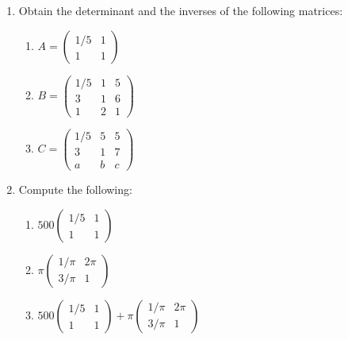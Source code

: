 \begin{enumerate}

\item 

Obtain the determinant and the inverses of the following matrices:
\begin{enumerate}

\item 

\(A = \begin{pmatrix} 1 / 5 & 1\\1 & 1\end{pmatrix}\)

\item 

\(B = \begin{pmatrix} 1 / 5 & 1 & 5\\3 & 1 & 6 \\ 1 & 2 & 1\end{pmatrix}\)

\item 

\(C = \begin{pmatrix} 1 / 5 & 5 & 5\\3 & 1 & 7 \\ a & b & c\end{pmatrix}\)

\end{enumerate}

\item 

Compute the following:
\begin{enumerate}

\item 

\(500\begin{pmatrix} 1 / 5 & 1\\1 & 1\end{pmatrix}\)

\item 

\(\pi \begin{pmatrix} 1 / \pi & 2\pi\\3/\pi & 1\end{pmatrix}\)

\item 

\(500\begin{pmatrix} 1 / 5 & 1\\1 & 1\end{pmatrix} + \pi \begin{pmatrix} 1 / \pi & 2\pi\\3/\pi & 1\end{pmatrix}\)


\end{enumerate}
\end{enumerate}
